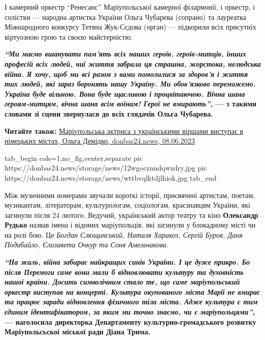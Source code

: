 І камерний оркестр \enquote{Ренесанс} Маріупольської камерної філармонії, і оркестр, і
солістки — народна артистка України Ольга Чубарева (сопрано) та лауреатка
Міжнародного конкурсу Тетяна Жук-Сєдова (орган) — підкорили всіх присутніх
віртуозною грою та своєю майстерністю.

\begin{leftbar}
  \begingroup
    \bfseries
{\color{blue}\em\enquote{Ми маємо вшанувати пам'ять всіх наших героїв, героїв-митців, інших
професій всіх людей, чиї життя забрала ця страшна, жорстока, нелюдська
війна. Я хочу, щоб ми всі разом з вами помолилися за здоров'я і життя
тих людей, які зараз боронять нашу Україну. Ми обов'язково переможемо.
Україна буде вільною. Вона буде щасливою і процвітаючою. Вічна шана
героям-митцям, вічна шана всім воїнам! Герої не вмирають}}, — з такими
словами зі сцени звернулася до всіх глядачів Ольга Чубарева. 
  \endgroup
\end{leftbar}

\textbf{Читайте також:} \href{https://donbas24.news/news/mariupolska-aktrisa-z-ukrayinskimi-virsami-vistupaje-v-nimeckix-mistax}{%
Маріупольська актриса з українськими віршами виступає в німецьких містах, Ольга Демідко, donbas24.news, 08.06.2023}

\ifcmt
  tab_begin cols=1,no_fig,center,separate
     pic https://donbas24.news/storage/news/12wgocznndqwzdry.jpg
     pic https://donbas24.news/storage/news/wttbvqlktdjlhiok.jpg
  tab_end
\fi

Між музичними номерами звучали короткі історії, присвячені артистам, поетам,
музикантам, літераторам, культурологам, соціологам, краєзнавцям України, які
загинули після 24 лютого. Ведучий, український актор театру та кіно \textbf{Олександр
Рудько} назвав імена і відомих маріупольців, які загинули у блокадному місті чи
на ролі бою. Це \emph{Богдан Слющинський, Наталя Харакоз, Сергій Буров, Даня
Подибайло, Єлизавета Очкур та Соня Амельчакова}.

\begin{leftbar}
  \begingroup
    \bfseries
{\em\color{blue}\enquote{На жаль, війна забирає найкращих синів України. І це дуже прикро. Бо
після Перемоги саме вони мали б відновлювати культуру та духовність
нашої країни. Досить символічним стало те, що саме маріупольський
оркестр виступав на концерті. Культура окупованого міста Марії не
вмирає та працює заради відновлення фізичного тіла міста. Адже культура
є тим єдиним ідентифікатором, за яким ми точно знаємо, чи є
маріупольцями}}, — наголосила директорка Департаменту
культурно-громадського розвитку Маріупольсьскої міської ради Діана
Трима.
  \endgroup
\end{leftbar}

